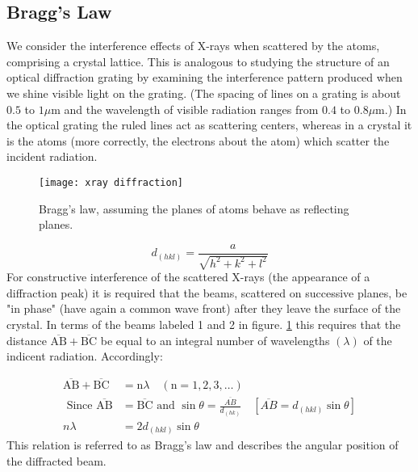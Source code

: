 \subsection{Bragg's Law}
We consider the interference effects of X-rays when scattered by the atoms, comprising a crystal lattice. This is analogous to studying the structure of an optical diffraction grating by examining the interference pattern produced when we shine visible light on the grating. (The spacing of lines on a grating is about $0.5$ to $1 \mu \mathrm{m}$ and the wavelength of visible radiation ranges from $0.4$ to $0.8 \mu \mathrm{m}$.) In the optical grating the ruled lines act as scattering centers, whereas in a crystal it is the atoms (more correctly, the electrons about the atom) which scatter the incident radiation.
\begin{figure}[H]
	\centering
	\texttt{[image: xray diffraction]}
	\caption{Bragg's law, assuming the planes of atoms behave as reflecting planes.}
	\label{Bragg's law}
\end{figure}
\begin{equation}
d_{(h k l)}=\frac{a}{\sqrt{h^{2}+k^{2}+l^{2}}}
\end{equation}
For constructive interference of the scattered X-rays (the appearance of a diffraction peak) it is required that the beams, scattered on successive planes, be "in phase" (have again a common wave front) after they leave the surface of the crystal. In terms of the beams labeled 1 and 2 in figure. \ref{Bragg's law} this requires that the distance $\overline{\mathrm{AB}}+\overline{\mathrm{BC}}$ be equal to an integral number of wavelengths $(\lambda)$ of the indicent radiation. Accordingly:

\begin{align}
\overline{\mathrm{AB}}+\overline{\mathrm{BC}}&=\mathrm{n} \lambda \quad(\mathrm{n}=1,2,3, \ldots) \\
\text { Since } \overline{\mathrm{AB}}&=\overline{\mathrm{BC}} \text { and } \sin \theta=\frac{\overline{A B}}{d_{(h k)}}\quad \left[\overline{A B}=d_{(h k l)} \sin \theta\right] \\
n \lambda&=2 d_{(h k l)} \sin \theta
\end{align}
This relation is referred to as Bragg’s law and describes the angular position of the
diffracted beam.
